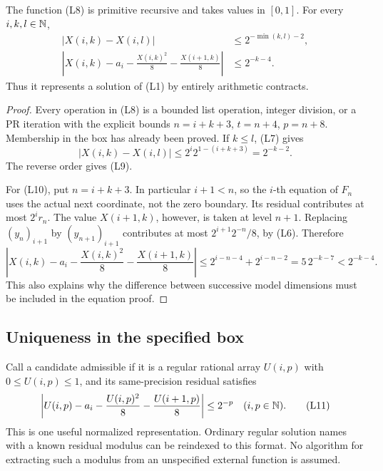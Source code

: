 \begin{theorem}
\label{thm:lattice-name}
The function (L8) is primitive recursive and takes values in \([0,1]\).
For every \(i,k,l\in\mathbb N\),
\begin{align}
 |X(i,k)-X(i,l)|&\le2^{-\min(k,l)-2},          \tag{L9}\\
 \left|X(i,k)-a_i-\frac{X(i,k)^2}{8}
                      -\frac{X(i+1,k)}8\right|
 &\le2^{-k-4}.                               \tag{L10}
\end{align}
Thus it represents a solution of (L1) by entirely arithmetic contracts.
\end{theorem}
\begin{proof}
Every operation in (L8) is a bounded list operation, integer division,
or a PR iteration with the explicit bounds \(n=i+k+3\),
\(t=n+4\), \(p=n+8\). Membership in the box has already been
proved. If \(k\le l\), (L7) gives
\[
 |X(i,k)-X(i,l)|\le2^i2^{1-(i+k+3)}=2^{-k-2}.
\]
The reverse order gives (L9).

For (L10), put \(n=i+k+3\). In particular \(i+1<n\), so
the \(i\)-th equation of \(F_n\) uses the actual next coordinate,
not the zero boundary. Its residual contributes at most
\(2^ir_n\). The value \(X(i+1,k)\), however, is taken at level
\(n+1\). Replacing \((y_n)_{i+1}\) by \((y_{n+1})_{i+1}\)
contributes at most \(2^{i+1}2^{-n}/8\), by (L6). Therefore
\[
 \left|X(i,k)-a_i-\frac{X(i,k)^2}{8}-\frac{X(i+1,k)}8\right|
 \le2^{i-n-4}+2^{i-n-2}
 =5\,2^{-k-7}<2^{-k-4}.
\]
This also explains why the difference between successive model
dimensions must be included in the equation proof.
\end{proof}

\subsection{Uniqueness in the specified box}

Call a candidate admissible if it is a regular rational array \(U(i,p)\)
with \(0\le U(i,p)\le1\), and its same-precision residual satisfies
\[
 \left|U(i,p)-a_i-\frac{U(i,p)^2}{8}
                     -\frac{U(i+1,p)}8\right|\le2^{-p}
 \quad(i,p\in\mathbb N).                              \tag{L11}
\]
This is one useful normalized representation. Ordinary regular
solution names with a known residual modulus can be reindexed to
this format. No algorithm for extracting such a modulus from an
unspecified external function is assumed.

